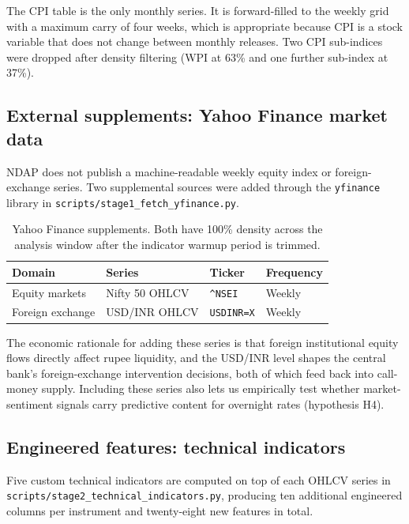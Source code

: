 The CPI table is the only monthly series. It is forward-filled to the
weekly grid with a maximum carry of four weeks, which is appropriate
because CPI is a stock variable that does not change between monthly
releases. Two CPI sub-indices were dropped after density filtering
(WPI at 63\% and one further sub-index at 37\%).

\subsection{External supplements: Yahoo Finance market data}

NDAP does not publish a machine-readable weekly equity index or
foreign-exchange series. Two supplemental sources were added through
the \texttt{yfinance} library in \texttt{scripts/stage1\_fetch\_yfinance.py}.

\begin{table}[H]
\caption{Yahoo Finance supplements. Both have 100\% density across the
analysis window after the indicator warmup period is trimmed.}
\label{tab:yfinance-sources}
\renewcommand{\arraystretch}{1.2}
\begin{tabularx}{\linewidth}{@{} l Y l l @{}}
\toprule
{}\color{white}\textbf{Domain} &
\color{white}\textbf{Series} &
\color{white}\textbf{Ticker} &
\color{white}\textbf{Frequency} \\
\midrule
Equity markets & Nifty 50 OHLCV & \texttt{\textasciicircum NSEI} & Weekly \\
Foreign exchange & USD/INR OHLCV & \texttt{USDINR=X} & Weekly \\
\bottomrule
\end{tabularx}
\end{table}

The economic rationale for adding these series is that foreign
institutional equity flows directly affect rupee liquidity, and the
USD/INR level shapes the central bank's foreign-exchange intervention
decisions, both of which feed back into call-money supply. Including
these series also lets us empirically test whether market-sentiment
signals carry predictive content for overnight rates (hypothesis H4).

\subsection{Engineered features: technical indicators}

Five custom technical indicators are computed on top of each OHLCV
series in \texttt{scripts/stage2\_technical\_indicators.py}, producing ten
additional engineered columns per instrument and twenty-eight new
features in total.

